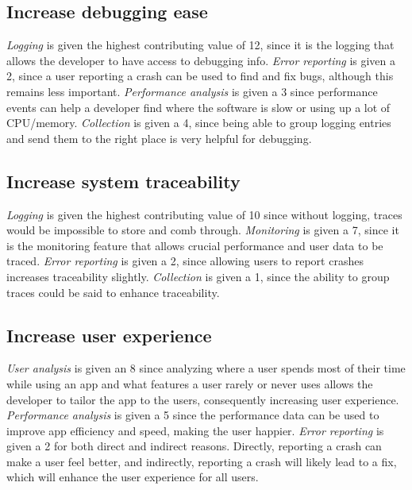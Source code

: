 \documentclass[paper=letter, fontsize=12pt]{scrartcl} %
\numberwithin{equation}{section} %
\numberwithin{figure}{section} %
\numberwithin{table}{section} %
\begin{document}
\subsection{Increase debugging ease}
\hspace*{.5cm} \textit{Logging} is given the highest contributing value of 12, since it is the logging that allows the developer to have access to debugging info. \textit{Error reporting} is given a 2, since a user reporting a crash can be used to find and fix bugs, although this remains less important. \textit{Performance analysis} is given a 3 since performance events can help a developer find where the software is slow or using up a lot of CPU/memory. \textit{Collection} is given a 4, since being able to group logging entries and send them to the right place is very helpful for debugging.

\subsection{Increase system traceability}
\hspace*{.5cm} \textit{Logging} is given the highest contributing value of 10 since without logging, traces would be impossible to store and comb through. \textit{Monitoring} is given a 7, since it is the monitoring feature that allows crucial performance and user data to be traced. \textit{Error reporting} is given a 2, since allowing users to report crashes increases traceability slightly. \textit{Collection} is given a 1, since the ability to group traces could be said to enhance traceability.

\subsection{Increase user experience}
\hspace*{.5cm} \textit{User analysis} is given an 8 since analyzing where a user spends most of their time while using an app and what features a user rarely or never uses allows the developer to tailor the app to the users, consequently increasing user experience. \textit{Performance analysis} is given a 5 since the performance data can be used to improve app efficiency and speed, making the user happier. \textit{Error reporting} is given a 2 for both direct and indirect reasons. Directly, reporting a crash can make a user feel better, and indirectly, reporting a crash will likely lead to a fix, which will enhance the user experience for all users.


\end{document}
